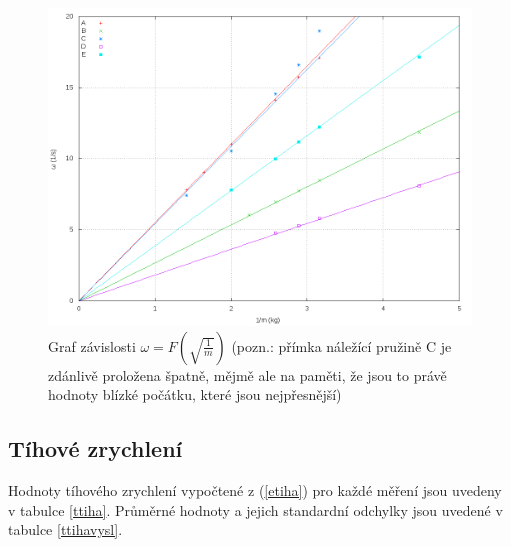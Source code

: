 \documentclass{article}
\begin{document}
\begin{figure} \label{gwm} 
\centering
\includegraphics[width=\textwidth]{gwm}
\caption{Graf závislosti $ \omega = F(\sqrt{\frac{1}{m}}) $ (pozn.: přímka náležící pružině C je zdánlivě proložena špatně, mějmě ale na paměti, že jsou to právě hodnoty blízké počátku, které jsou nejpřesnější)}
\end{figure} 


\subsection*{Tíhové zrychlení}

Hodnoty tíhového zrychlení vypočtené z (\ref{etiha}) pro každé měření jsou uvedeny v tabulce \ref{ttiha}. Průměrné hodnoty a jejich standardní odchylky jsou uvedené v tabulce \ref{ttihavysl}.
\end{document}

